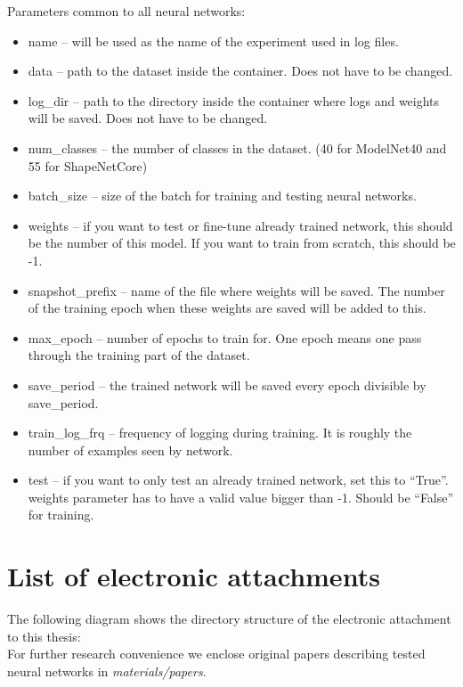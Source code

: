 Parameters common to all neural networks:
\begin{itemize}
	\item{name -- will be used as the name of the experiment used in log files.}
	\item{data -- path to the dataset inside the container. Does not have to be changed.}
	\item{log\_dir -- path to the directory inside the container where logs and weights will be saved. Does not have to be changed.}
	\item{num\_classes -- the number of classes in the dataset. (40 for ModelNet40 and 55 for ShapeNetCore)}
	\item{batch\_size -- size of the batch for training and testing neural networks.}
	\item{weights -- if you want to test or fine-tune already trained network, this should be the number of this model. If you want to train from scratch, this should be -1.}
	\item{snapshot\_prefix -- name of the file where weights will be saved. The number of the training epoch when these weights are saved will be added to this.}
	\item{max\_epoch -- number of epochs to train for. One epoch means one pass through the training part of the dataset.}
	\item{save\_period -- the trained network will be saved every epoch divisible by save\_period.}
	\item{train\_log\_frq -- frequency of logging during training. It is roughly the number of examples seen by network.}
	\item{test -- if you want to only test an already trained network, set this to ``True''. weights parameter has to have a valid value bigger than -1. Should be ``False'' for training.}
\end{itemize}

\chapter{List of electronic attachments}
\label{Attachment:electronic}
The following diagram shows the directory structure of the electronic attachment to this thesis: \\
\vspace{1cm}
For further research convenience we enclose original papers describing tested neural networks in \textit{materials/papers}.


